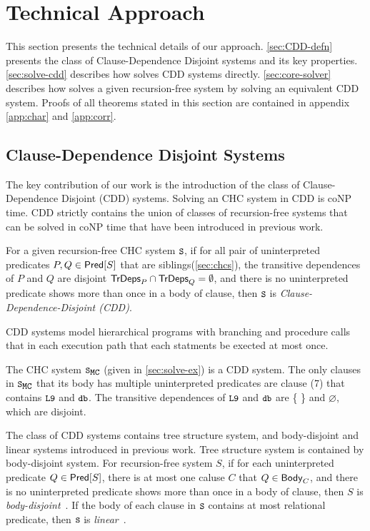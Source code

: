 \section{Technical Approach}
\label{sec:approach}
%
This section presents the technical details of our approach.
%
\autoref{sec:CDD-defn} presents the class of Clause-Dependence Disjoint
systems and its key properties.
%
\autoref{sec:solve-cdd} describes how \sys solves CDD systems
directly.
%
\autoref{sec:core-solver} describes how \sys solves a given
recursion-free system by solving an equivalent CDD system.
%
Proofs of all theorems stated in this section are contained in appendix
\autoref{app:char} and \autoref{app:corr}.

\subsection{Clause-Dependence Disjoint Systems}
\label{sec:CDD-defn}
%
The key contribution of our work is the introduction of the class of
Clause-Dependence Disjoint (CDD) systems.
%
Solving an CHC system in CDD is coNP time.
%
CDD strictly contains
the union of classes of recursion-free systems that can be solved
in coNP time that have been introduced in previous work.
%
\begin{defn}
  \label{defn:cdds}
  For a given recursion-free CHC system $\cc{S}$,
  if for all pair of uninterpreted predicates $P, Q \in \mathsf{Pred}[ S ]$ that are siblings(\autoref{sec:chcs}), the 
  transitive dependences of $P$ and $Q$ are disjoint $\mathsf{TrDeps}_{P} \cap \mathsf{TrDeps}_{Q} = \emptyset$, and there is 
  no uninterpreted predicate shows more than once in a body of clause, then $\cc{S}$ is
  \emph{Clause-Dependence-Disjoint (CDD)}.
\end{defn}
%
CDD systems model hierarchical programs with branching and
procedure calls that in each execution path that each statments be
exected at most once.
%
\begin{ex}
  The CHC system $\mcchc$ (given in \autoref{sec:solve-ex}) is a CDD
  system.
  The only clauses in $\mcchc$ that its body has multiple uninterpreted
  predicates are clause (7) that contains $\cc{L9}$ and $\cc{db}$.
  The transitive dependences of $\cc{L9}$ and $\cc{db}$ are \{\,\,\} and $\varnothing$, which are disjoint.
\end{ex}

The class of CDD systems contains tree structure system, and body-disjoint and linear
systems introduced in previous work.
%
Tree structure system is contained by body-disjoint system. 
%
For recursion-free system $S$, if for each uninterpreted predicate
$Q \in \mathsf{Pred}[ S ]$, there is at most one caluse $C$ that $Q \in \mathsf{Body}_{C}$,
and there is no uninterpreted predicate shows more than once in a body of clause, then
$S$ is \emph{body-disjoint}~\cite{rummer13a,rummer13b}.
%
If the body of each clause in $\cc{S}$ contains at most
relational predicate, then $\cc{S}$ is
\emph{linear}~\cite{albarghouthi12a}.


